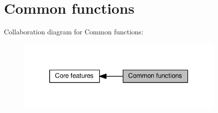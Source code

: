 \hypertarget{group__core__func__common}{}\section{Common functions}
\label{group__core__func__common}
Collaboration diagram for Common functions\+:
\nopagebreak
\begin{figure}[H]
\begin{center}
\leavevmode
\includegraphics[width=291pt]{d0/de3/group__core__func__common}
\end{center}
\end{figure}
